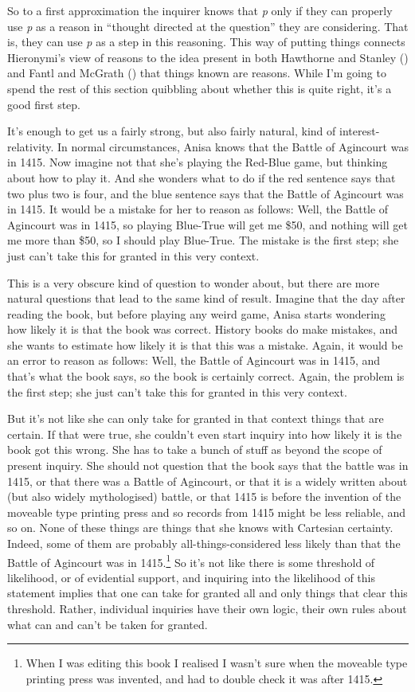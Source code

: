 \documentclass[
  10pt,
  letterpaper,
  twoside]{scrbook}
\begin{document}
So to a first approximation the inquirer knows that \emph{p} only if
they can properly use \emph{p} as a reason in ``thought directed at the
question'' they are considering. That is, they can use \emph{p} as a
step in this reasoning. This way of putting things connects Hieronymi's
view of reasons to the idea present in both Hawthorne and Stanley
() and Fantl and McGrath
() that things known are reasons.
While I'm going to spend the rest of this section quibbling about
whether this is quite right, it's a good first step.

It's enough to get us a fairly strong, but also fairly natural, kind of
interest-relativity. In normal circumstances, Anisa knows that the
Battle of Agincourt was in 1415. Now imagine not that she's playing the
Red-Blue game, but thinking about how to play it. And she wonders what
to do if the red sentence says that two plus two is four, and the blue
sentence says that the Battle of Agincourt was in 1415. It would be a
mistake for her to reason as follows: Well, the Battle of Agincourt was
in 1415, so playing Blue-True will get me \$50, and nothing will get me
more than \$50, so I should play Blue-True. The mistake is the first
step; she just can't take this for granted in this very context.

This is a very obscure kind of question to wonder about, but there are
more natural questions that lead to the same kind of result. Imagine
that the day after reading the book, but before playing any weird game,
Anisa starts wondering how likely it is that the book was correct.
History books do make mistakes, and she wants to estimate how likely it
is that this was a mistake. Again, it would be an error to reason as
follows: Well, the Battle of Agincourt was in 1415, and that's what the
book says, so the book is certainly correct. Again, the problem is the
first step; she just can't take this for granted in this very context.

But it's not like she can only take for granted in that context things
that are certain. If that were true, she couldn't even start inquiry
into how likely it is the book got this wrong. She has to take a bunch
of stuff as beyond the scope of present inquiry. She should not question
that the book says that the battle was in 1415, or that there was a
Battle of Agincourt, or that it is a widely written about (but also
widely mythologised) battle, or that 1415 is before the invention of the
moveable type printing press and so records from 1415 might be less
reliable, and so on. None of these things are things that she knows with
Cartesian certainty. Indeed, some of them are probably
all-things-considered less likely than that the Battle of Agincourt was
in 1415.\footnote{When I was editing this book I realised I wasn't sure
  when the moveable type printing press was invented, and had to double
  check it was after 1415.} So it's not like there is some threshold of
likelihood, or of evidential support, and inquiring into the likelihood
of this statement implies that one can take for granted all and only
things that clear this threshold. Rather, individual inquiries have
their own logic, their own rules about what can and can't be taken for
granted.
\end{document}
